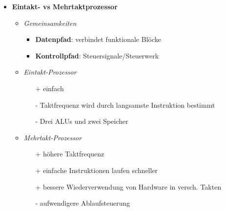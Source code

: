\begin{itemize}
        \item \textbf{Eintakt- vs Mehrtaktprozessor}
            \begin{itemize}
                \item \textit{Gemeinsamkeiten}
                    \begin{itemize}
                        \item \textbf{Datenpfad}: verbindet funktionale Blöcke
                        \item \textbf{Kontrollpfad}: Steuersignale/Steuerwerk
                    \end{itemize}
                \item \textit{Eintakt-Prozessor}
                    \begin{itemize}
                        \item[+] einfach
                        \item[-] Taktfrequenz wird durch langsamste Instruktion bestimmt
                        \item[-] Drei ALUs und zwei Speicher  
                    \end{itemize}
                \item \textit{Mehrtakt-Prozessor}
                    \begin{itemize}
                        \item[+] höhere Taktfrequenz
                        \item[+] einfache Instruktionen laufen schneller
                        \item[+] bessere Wiederverwendung von Hardware in versch. Takten
                        \item[-] aufwendigere Ablaufsteuerung   
                    \end{itemize}
            \end{itemize}
    \end{itemize}

